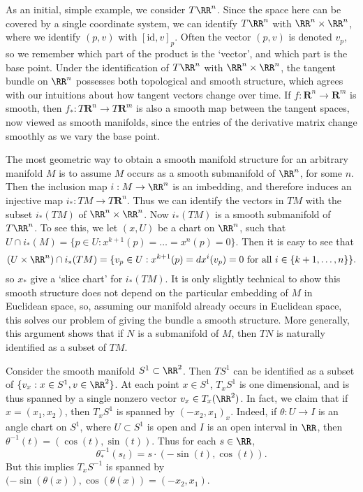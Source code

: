 As an initial, simple example, we consider $T\RR^n$. Since the space here can be covered by a single coordinate system, we can identify $T\RR^n$ with $\RR^n \times \RR^n$, where we identify $(p,v)$ with $[\text{id}, v]_p$. Often the vector $(p,v)$ is denoted $v_p$, so we remember which part of the product is the `vector', and which part is the base point. Under the identification of $T\RR^n$ with $\RR^n \times \RR^n$, the tangent bundle on $\RR^n$ possesses both topological and smooth structure, which agrees with our intuitions about how tangent vectors change over time. If $f: \mathbf{R}^n \to \mathbf{R}^m$ is smooth, then $f_*: T\mathbf{R}^n \to T\mathbf{R}^m$ is also a smooth map between the tangent spaces, now viewed as smooth manifolds, since the entries of the derivative matrix change smoothly as we vary the base point.

The most geometric way to obtain a smooth manifold structure for an arbitrary manifold $M$ is to assume $M$ occurs as a smooth submanifold of $\RR^n$, for some $n$. Then the inclusion map $i: M \to \RR^n$ is an imbedding, and therefore induces an injective map $i_*: TM \to T\mathbf{R}^n$. Thus we can identify the vectors in $TM$ with the subset $i_*(TM)$ of $\RR^n \times \RR^n$. Now $i_*(TM)$ is a smooth submanifold of $T\RR^n$. To see this, we let $(x,U)$ be a chart on $\RR^n$, such that $U \cap i_*(M) = \{ p \in U: x^{k+1}(p) = \dots = x^n(p) = 0 \}$. Then it is easy to see that
%
\[ (U \times \RR^n) \cap i_*(TM) = \{ v_p \in U: x^{k+1}(p) = dx^i(v_p) = 0\ \text{for all}\ i \in \{ k+1, \dots, n \} \}. \]
%
so $x_*$ give a `slice chart' for $i_*(TM)$. It is only slightly technical to show this smooth structure does not depend on the particular embedding of $M$ in Euclidean space, so, assuming our manifold already occurs in Euclidean space, this solves our problem of giving the bundle a smooth structure. More generally, this argument shows that if $N$ is a submanifold of $M$, then $TN$ is naturally identified as a subset of $TM$.

\begin{example}
    Consider the smooth manifold $S^1 \subset \RR^2$. Then $TS^1$ can be identified as a subset of $\{ v_x: x \in S^1, v \in \RR^2 \}$. At each point $x \in S^1$, $T_xS^1$ is one dimensional, and is thus spanned by a single nonzero vector $v_x \in T_x(\RR^2)$. In fact, we claim that if $x = (x_1,x_2)$, then $T_xS^1$ is spanned by $(-x_2,x_1)_x$. Indeed, if $\theta: U \to I$ is an angle chart on $S^1$, where $U \subset S^1$ is open and $I$ is an open interval in $\RR$, then $\theta^{-1}(t) = (\cos(t), \sin(t))$. Thus for each $s \in \RR$,
    \[ \theta^{-1}_*(s_t) = s \cdot (-\sin(t), \cos(t)). \]
    But this implies $T_x S^{-1}$ is spanned by $(-\sin(\theta(x)), \cos(\theta(x)) = (-x_2,x_1)$.
\end{example}

